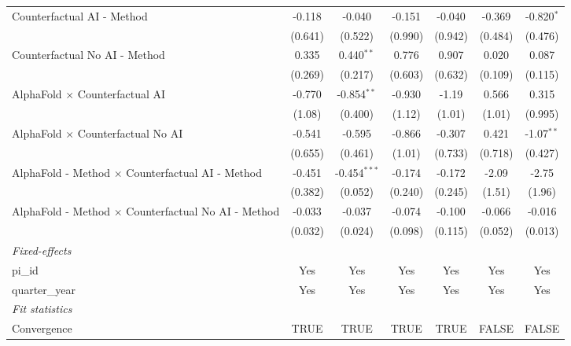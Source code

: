 \begin{tabular}{lcccccc}
   Counterfactual AI - Method                                 & -0.118  & -0.040         & -0.151  & -0.040  & -0.369  & -0.820$^{*}$\\   
                                                              & (0.641) & (0.522)        & (0.990) & (0.942) & (0.484) & (0.476)\\   
   Counterfactual No AI - Method                              & 0.335   & 0.440$^{**}$   & 0.776   & 0.907   & 0.020   & 0.087\\   
                                                              & (0.269) & (0.217)        & (0.603) & (0.632) & (0.109) & (0.115)\\   
   AlphaFold $\times$ Counterfactual AI                       & -0.770  & -0.854$^{**}$  & -0.930  & -1.19   & 0.566   & 0.315\\   
                                                              & (1.08)  & (0.400)        & (1.12)  & (1.01)  & (1.01)  & (0.995)\\   
   AlphaFold $\times$ Counterfactual No AI                    & -0.541  & -0.595         & -0.866  & -0.307  & 0.421   & -1.07$^{**}$\\   
                                                              & (0.655) & (0.461)        & (1.01)  & (0.733) & (0.718) & (0.427)\\   
   AlphaFold - Method $\times$ Counterfactual AI - Method     & -0.451  & -0.454$^{***}$ & -0.174  & -0.172  & -2.09   & -2.75\\   
                                                              & (0.382) & (0.052)        & (0.240) & (0.245) & (1.51)  & (1.96)\\   
   AlphaFold - Method $\times$ Counterfactual No AI - Method  & -0.033  & -0.037         & -0.074  & -0.100  & -0.066  & -0.016\\   
                                                              & (0.032) & (0.024)        & (0.098) & (0.115) & (0.052) & (0.013)\\   
   \midrule
   \emph{Fixed-effects}\\
   pi\_id                                                     & Yes     & Yes            & Yes     & Yes     & Yes     & Yes\\  
   quarter\_year                                              & Yes     & Yes            & Yes     & Yes     & Yes     & Yes\\  
   \midrule
   \emph{Fit statistics}\\
   Convergence                                                &TRUE     & TRUE           & TRUE    & TRUE    & FALSE   & FALSE\\  

\end{tabular}
